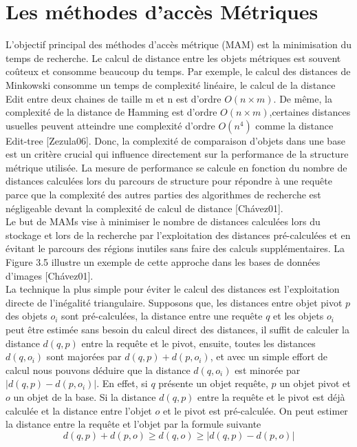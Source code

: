 \section{Les méthodes d’accès Métriques}
L'objectif principal des méthodes d’accès métrique (MAM) est la minimisation du temps de recherche. Le calcul de distance entre les objets métriques est souvent coûteux et consomme beaucoup du temps. Par exemple, le calcul des distances de Minkowski consomme un temps de complexité linéaire, le calcul de la distance Edit entre deux chaines de taille m et n est d’ordre $ O(n\times m) $. De même, la complexité de la distance de Hamming est d’ordre $ O(n\times m) $,certaines distances usuelles peuvent atteindre une complexité d’ordre $ O(n^4)  $ comme la distance Edit-tree [Zezula06]. Donc, la complexité de comparaison d’objets dans une base est un critère crucial qui influence directement sur la performance de la structure métrique utilisée. La mesure de performance se calcule en fonction du nombre de distances calculées lors du parcours de structure pour répondre à une requête parce que la complexité des autres parties des algorithmes de recherche est négligeable devant la complexité de calcul de distance [Chávez01].\\

Le but de MAMs vise à minimiser le nombre de distances calculées lors du stockage et lors de la recherche par l’exploitation des distances pré-calculées et en évitant le parcours des régions inutiles sans faire des calculs supplémentaires. La Figure 3.5 illustre un exemple de cette approche dans les bases de données d’images [Chávez01].\\


La technique la plus simple pour éviter le calcul des distances est l’exploitation directe de l’inégalité triangulaire. Supposons que, les distances entre objet pivot $ p $ des objets $ o_i $ sont pré-calculées, la distance entre une requête $ q $ et les objets $ o_i $ peut être estimée sans besoin du calcul direct des distances, il suffit de calculer la distance $ d(q,p) $ entre la requête et le pivot, ensuite, toutes les distances $ d(q,o_i) $ sont majorées par $ d(q,p)+d(p,o_i) $, et avec un simple effort de calcul nous pouvons déduire que la distance $ d(q,o_i) $ est minorée par $ |d(q,p)-d(p,o_i)| $. En effet, si $ q $ présente un objet requête, $ p $ un objet pivot et $ o $ un objet de la base. Si la distance $ d(q,p) $ entre la requête et le pivot est déjà calculée et la distance entre l’objet $ o $ et le pivot est pré-calculée. On peut estimer la distance entre la requête et l’objet par la formule suivante 
\begin{equation}
    d(q,p)+d(p,o) \geq d(q,o) \geq |d(q,p)-d(p,o)|
\end{equation}

